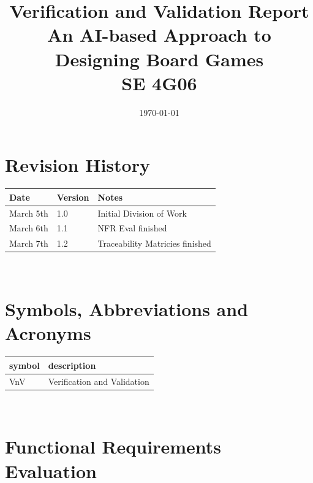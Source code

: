 \documentclass[12pt, titlepage]{article}
\begin{document}
\title{Verification and Validation Report \\ An AI-based Approach to Designing Board Games \\ SE 4G06} 
\author{\authname{}}
\date{\today}
	
\maketitle


\section{Revision History}

\begin{tabularx}{\textwidth}{p{3cm}p{2cm}X}
\toprule {\bf Date} & {\bf Version} & {\bf Notes}\\
\midrule
March 5th & 1.0 & Initial Division of Work\\
March 6th & 1.1 & NFR Eval finished\\
March 7th & 1.2 & Traceability Matricies finished\\
\bottomrule
\end{tabularx}

~\newpage

\section{Symbols, Abbreviations and Acronyms}

\renewcommand{\arraystretch}{1.2}
\begin{tabular}{l l} 
  \toprule		
  \textbf{symbol} & \textbf{description}\\
  \midrule 
  VnV & Verification and Validation \\
  \bottomrule
\end{tabular}\\


\newpage

\tableofcontents

\listoftables %

\listoffigures %

\newpage


\section{Functional Requirements Evaluation}
\end{document}
